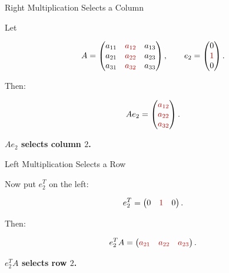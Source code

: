 \documentclass[10pt]{beamer}
\theoremstyle{definition}
\newcommand{\x}[1]{\alert{\textbf{#1}}}
\newcommand{\rd}[1]{{\color{red!70!black}#1}}
\begin{document}
\begin{frame}{Right Multiplication Selects a Column}

Let

$$
A=
\begin{pmatrix}
a_{11}&\rd{a_{12}}&a_{13}\\
a_{21}&\rd{a_{22}}&a_{23}\\
a_{31}&\rd{a_{32}}&a_{33}
\end{pmatrix},
\qquad
e_2=\begin{pmatrix}0\\\rd{1}\\0\end{pmatrix}.
$$

\vfill

Then:

$$
Ae_2=
\begin{pmatrix}
\rd{a_{12}}\\
\rd{a_{22}}\\
\rd{a_{32}}
\end{pmatrix}.
$$

\vfill

\begin{center}
\x{$Ae_2$ selects column $2$.}
\end{center}

\end{frame}


\begin{frame}{Left Multiplication Selects a Row}

Now put $e_2^T$ on the left:

$$
e_2^T=\begin{pmatrix}0&\rd{1}&0\end{pmatrix}.
$$

\vfill

Then:

$$
e_2^TA
=
\begin{pmatrix}
\rd{a_{21}}&\rd{a_{22}}&\rd{a_{23}}
\end{pmatrix}.
$$

\vfill

\begin{center}
\x{$e_2^TA$ selects row $2$.}
\end{center}

\end{frame}
\end{document}
